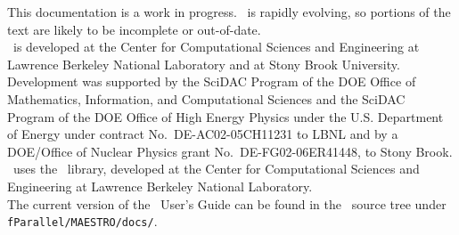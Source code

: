 This documentation is a work in progress.  \maestro\ is rapidly
evolving, so portions of the text are likely to be incomplete or
out-of-date. \\

\noindent \maestro\ is developed at the Center for Computational Sciences and
Engineering at Lawrence Berkeley National Laboratory and at Stony
Brook University.  Development was supported by the SciDAC Program of
the DOE Office of Mathematics, Information, and Computational Sciences
and the SciDAC Program of the DOE Office of High Energy Physics under
the U.S. Department of Energy under contract No.\ DE-AC02-05CH11231 to
LBNL and by a DOE/Office of Nuclear Physics grant No.\
DE-FG02-06ER41448, to Stony Brook. \maestro\ uses the \boxlib\ library,
developed at the Center for Computational Sciences and
Engineering at Lawrence Berkeley National Laboratory.
\\

\noindent The current version of the \maestro\ User's Guide can be found in 
the \maestro\ source tree under {\tt fParallel/MAESTRO/docs/}.
